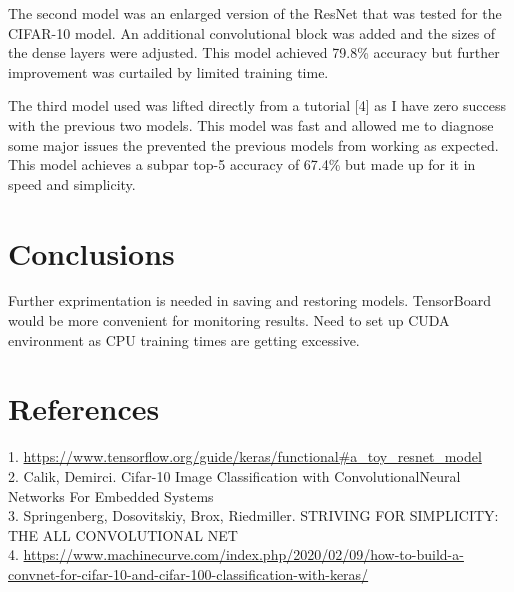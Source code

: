 \documentclass[]{article}
\begin{document}
The second model was an enlarged version of the ResNet that was tested for the CIFAR-10 model. An additional convolutional block was added and the sizes of the dense layers were adjusted. This model achieved 79.8\% accuracy but further improvement was curtailed by limited training time. 

The third model used was lifted directly from a tutorial [4] as I have zero success with the previous two models. This model was fast and allowed me to diagnose some major issues the prevented the previous models from working as expected. This model achieves a subpar top-5 accuracy of 67.4\% but made up for it in speed and simplicity.   

\section{Conclusions}

Further exprimentation is needed in saving and restoring models. TensorBoard would be more convenient for monitoring results. Need to set up CUDA environment as CPU training times are getting excessive.

\section{References}

1. \url{https://www.tensorflow.org/guide/keras/functional\#a_toy_resnet_model} \\
2.  Calik, Demirci. Cifar-10 Image Classification with ConvolutionalNeural Networks For Embedded Systems \\
3. Springenberg, Dosovitskiy, Brox, Riedmiller. STRIVING FOR SIMPLICITY: THE ALL CONVOLUTIONAL NET \\
4. \url{https://www.machinecurve.com/index.php/2020/02/09/how-to-build-a-convnet-for-cifar-10-and-cifar-100-classification-with-keras/}
\end{document}
